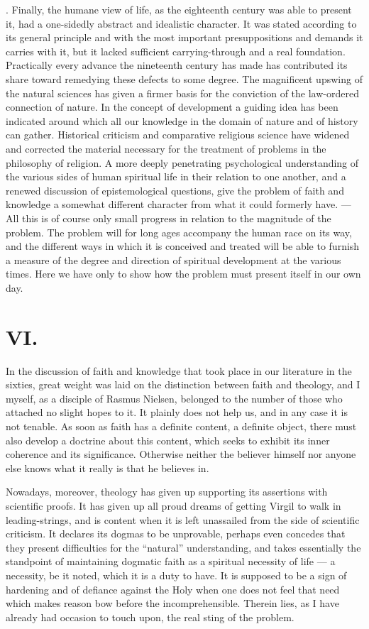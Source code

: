 \documentclass[12pt,a4paper]{article}
\begin{document}
\medskip
{}. Finally, the humane view of life, as the eighteenth century was
able to present it, had a one-sidedly abstract and idealistic character. It
was stated according to its general principle and with the most important
presuppositions and demands it carries with it, but it lacked sufficient
carrying-through and a real foundation. Practically every advance the
nineteenth century has made has contributed its share toward remedying these
defects to some degree. The magnificent upswing of the natural sciences has
given a firmer basis for the conviction of the law-ordered connection of
nature. In the concept of development a guiding idea has been indicated around
which all our knowledge in the domain of nature and of history can gather.
Historical criticism and comparative religious science have widened and
corrected the material necessary for the treatment of problems in the
philosophy of religion. A more deeply penetrating psychological understanding
of the various sides of human spiritual life in their relation to one another,
and a renewed discussion of epistemological questions, give the problem of
faith and knowledge a somewhat different character from what it could formerly
have. --- All this is of course only small progress in relation to the
magnitude of the problem. The problem will for long ages accompany the human
race on its way, and the different ways in which it is conceived and treated
will be able to furnish a measure of the degree and direction of spiritual
development at the various times. Here we have only to show how the problem
must present itself in our own day.

\section*{VI.}

In the discussion of faith and knowledge that took place in our literature in
the sixties, great weight was laid on the distinction between faith and
theology, and I myself, as a disciple of Rasmus Nielsen, belonged to the number
of those who attached no slight hopes to it. It plainly does not help us, and
in any case it is not tenable. As soon as faith has a definite content, a
definite object, there must also develop a doctrine about this content, which
seeks to exhibit its inner coherence and its significance. Otherwise neither
the believer himself nor anyone else knows what it really is that he believes
in.

Nowadays, moreover, theology has given up supporting its assertions with
scientific proofs. It has given up all proud dreams of getting Virgil to walk
in leading-strings, and is content when it is left unassailed from the side of
scientific criticism. It declares its dogmas to be unprovable, perhaps even
concedes that they present difficulties for the ``natural'' understanding, and
takes essentially the standpoint of maintaining dogmatic faith as a spiritual
necessity of life --- a necessity, be it noted, which it is a duty to have. It
is supposed to be a sign of hardening and of defiance against the Holy when one
does not feel that need which makes reason bow before the incomprehensible.
Therein lies, as I have already had occasion to touch upon, the real sting of
the problem.
\end{document}
